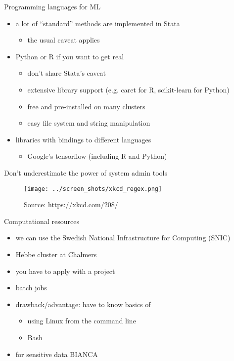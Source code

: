 \documentclass[xcolor=dvipsnames, handout]{beamer}
\begin{document}
\begin{frame}{Programming languages for ML}
\begin{itemize}
  \item a lot of ``standard'' methods are implemented in Stata
  \begin{itemize}
    \item the usual caveat applies 
  \end{itemize}
  \pause
  \item Python or R if you want to get real
  \begin{itemize}
    \item don't share Stata's caveat
    \item extensive library support (e.g. caret for R, scikit-learn for Python)
    \item free and pre-installed on many clusters
    \item easy file system and string manipulation 
  \end{itemize}
  \pause
  \item libraries with bindings to different languages
  \begin{itemize}
    \item Google's tensorflow (including R and Python)
  \end{itemize}
  \end{itemize}
\end{frame}


\begin{frame}{Don't underestimate the power of system admin tools}
\begin{figure}
  \texttt{[image: ../screen\_shots/xkcd\_regex.png]}
   \caption{Source: https://xkcd.com/208/}
\end{figure}
\end{frame}


\begin{frame}{Computational resources}
\begin{itemize}
  \item we can use the Swedish National Infrastructure for Computing (SNIC) 
  \item Hebbe cluster at Chalmers 
  \item you have to apply with a project
  \item batch jobs
  \item drawback/advantage: have to know basics of
  \begin{itemize}
    \item using Linux from the command line
    \item Bash
  \end{itemize}
  \item for sensitive data BIANCA
\end{itemize}
\end{frame}

\appendix
\end{document}
